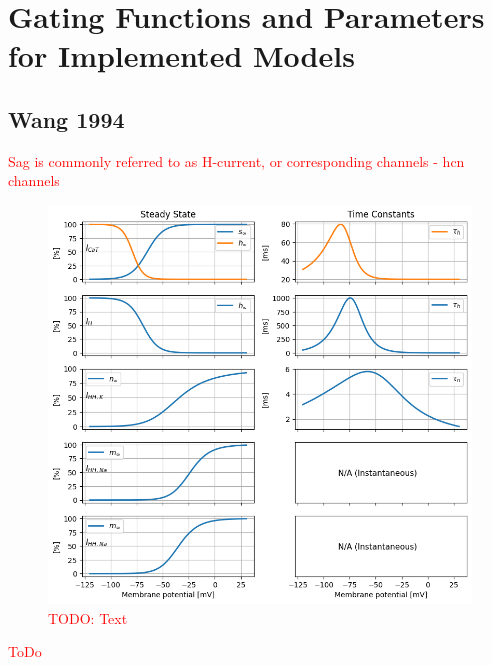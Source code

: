 \documentclass[../main.tex]{subfiles}
\begin{document}
\section{Gating Functions and Parameters for Implemented Models} \label{appendix:functions_and_parameters}

\subsection{Wang 1994}



\textcolor{red}{Sag is commonly referred to as H-current, or corresponding channels - \gls{hcn} channels}

\FloatBarrier

\begin{figure}[!h]
    \centering
    \includegraphics[width=\linewidth]{../img/model_kinetics/kinetics_wang.png}
    \caption[Wang 1994]{
        \textcolor{red}{TODO: Text}
    }
    \label{fig:kinetic_plots_wang1994}
\end{figure}

\FloatBarrier

\textcolor{red}{ToDo}
\end{document}
